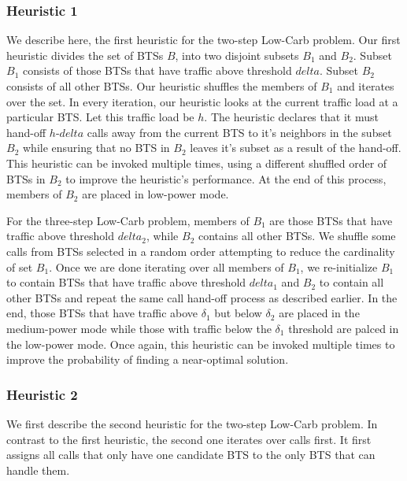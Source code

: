 \subsubsection{Heuristic 1}
\label{subsubsec:heuristic1} We describe here, the first heuristic for the two-step Low-Carb problem. Our first heuristic divides the set of BTSs $B$, into two disjoint subsets $B_1$ and $B_2$. Subset $B_1$ consists of those BTSs that have traffic above threshold $delta$. Subset $B_2$ consists of all other BTSs. Our heuristic shuffles the members of $B_1$ and iterates over the set. In every iteration, our heuristic looks at the current traffic load at a particular BTS. Let this traffic load be $h$. The heuristic declares that it must hand-off $h$-$delta$ calls away from the current BTS to it's neighbors in the subset $B_2$ while ensuring that no BTS in $B_2$ leaves it's subset as a result of the hand-off. This heuristic can be invoked multiple times, using a different shuffled order of BTSs in $B_2$ to improve the heuristic's performance. At the end of this process, members of $B_2$ are placed in low-power mode. 


For the three-step Low-Carb problem, members of $B_1$ are those BTSs that have traffic above threshold $delta_2$, while $B_2$ contains all other BTSs. We shuffle some calls from BTSs selected in a random order attempting to reduce the cardinality of set $B_1$. Once we are done iterating over all members of $B_1$, we re-initialize $B_1$ to contain BTSs that have traffic above threshold $delta_1$ and $B_2$ to contain all other BTSs and repeat the same call hand-off process as described earlier. In the end, those BTSs that have traffic above $\delta_1$ but below $\delta_2$ are placed in the medium-power mode while those with traffic below the $\delta_1$ threshold are palced in the low-power mode. Once again, this heuristic can be invoked multiple times to improve the probability of finding a near-optimal solution.

\subsubsection{Heuristic 2}
\label{subsubsec:heuristic2} We first describe the second heuristic for the two-step Low-Carb problem. In contrast to the first heuristic, the second one iterates over calls first. It first assigns all calls that only have one candidate BTS to the only BTS that can handle them.